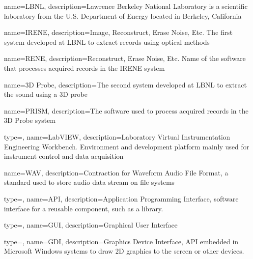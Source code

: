 %

{
    name=LBNL,
    description={Lawrence Berkeley National Laboratory is a scientific laboratory from the U.S. Department of Energy located in Berkeley, California}
}

{
    name=IRENE,
    description={Image, Reconstruct, Erase Noise, Etc. The first system developed at LBNL to extract records using optical methods}
}

{
    name=RENE,
    description={Reconstruct, Erase Noise, Etc. Name of the software that processes acquired records in the IRENE system}
}

{
    name=3D Probe,
    description={The second system developed at LBNL to extract the sound using a 3D probe}
}

{
    name=PRISM,
    description={The software used to process acquired records in the 3D Probe system}
}

{
    type=\acronymtype,
    name={LabVIEW},
    description={Laboratory Virtual Instrumentation Engineering Workbench. Environment and development platform mainly used for instrument control and data acquisition}
}

{
    name={WAV},
    description={Contraction for Waveform Audio File Format, a standard used to store audio data stream on file systems}
}

{
    type=\acronymtype,
    name={API},
    description={Application Programming Interface, software interface for a reusable component, such as a library.}
}

{
    type=\acronymtype,
    name={GUI},
    description={Graphical User Interface}
}

{
    type=\acronymtype,
    name={GDI},
    description={Graphics Device Interface, API embedded in Microsoft Windows systems to draw 2D graphics to the screen or other devices.}
}

